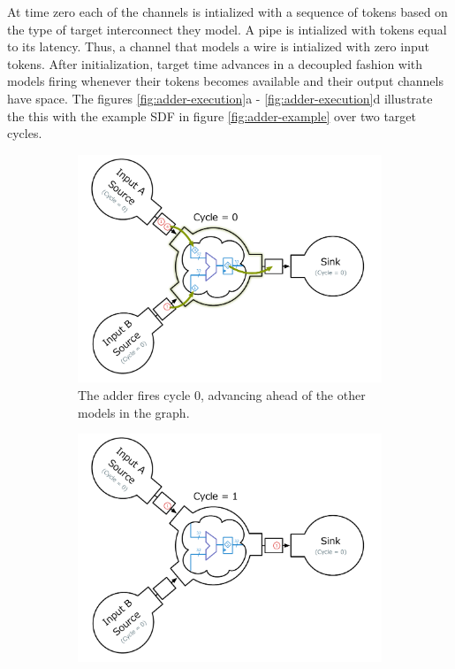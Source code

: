 At time zero each of the channels is intialized with a sequence of tokens based
on the type of target interconnect they model.  A pipe is intialized with
tokens equal to its latency. Thus, a channel that models a wire is intialized
with zero input tokens. After initialization, target time advances in a
decoupled fashion with models firing whenever their tokens becomes available
and their output channels have space. The figures \ref{fig:adder-execution}a -
\ref{fig:adder-execution}d illustrate the this with the example SDF in figure
\ref{fig:adder-example} over two target cycles.

\begin{figure}
    \begin{subfigure}[t]{0.45\textwidth}
	    \centering
        \includegraphics[width=\linewidth]{figures/adder-ex1.pdf}
        \caption{The adder fires cycle 0, advancing ahead of the other models
        in the graph.}
    \end{subfigure}
    \begin{subfigure}[t]{0.45\textwidth}
	    \centering
        \includegraphics[width=\linewidth]{figures/adder-ex2.pdf}

\end{subfigure}
\end{figure}
